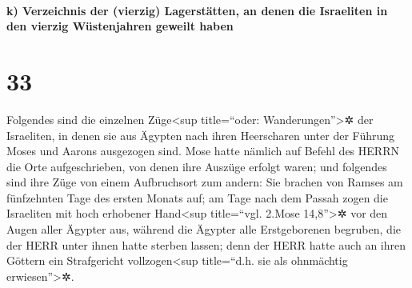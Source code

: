 \hypertarget{k-verzeichnis-der-vierzig-lagerstuxe4tten-an-denen-die-israeliten-in-den-vierzig-wuxfcstenjahren-geweilt-haben}{%
\paragraph{k) Verzeichnis der (vierzig) Lagerstätten, an denen die
Israeliten in den vierzig Wüstenjahren geweilt
haben}\label{k-verzeichnis-der-vierzig-lagerstuxe4tten-an-denen-die-israeliten-in-den-vierzig-wuxfcstenjahren-geweilt-haben}}

\hypertarget{section-32}{%
\section{33}\label{section-32}}

Folgendes sind die einzelnen Züge\textless sup
title=``oder: Wanderungen''\textgreater✲ der Israeliten, in denen sie
aus Ägypten nach ihren Heerscharen unter der Führung Moses und Aarons
ausgezogen sind. Mose hatte nämlich auf Befehl des HERRN
die Orte aufgeschrieben, von denen ihre Auszüge erfolgt waren; und
folgendes sind ihre Züge von einem Aufbruchsort zum andern:
Sie brachen von Ramses am fünfzehnten Tage des ersten
Monats auf; am Tage nach dem Passah zogen die Israeliten mit hoch
erhobener Hand\textless sup title=``vgl. 2.Mose 14,8''\textgreater✲ vor
den Augen aller Ägypter aus, während die Ägypter alle
Erstgeborenen begruben, die der HERR unter ihnen hatte sterben lassen;
denn der HERR hatte auch an ihren Göttern ein Strafgericht
vollzogen\textless sup title=``d.h. sie als ohnmächtig
erwiesen''\textgreater✲.

